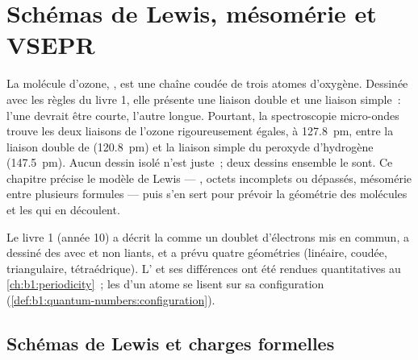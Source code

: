 \chapter{Schémas de Lewis, mésomérie et VSEPR}\label{ch:b1:lewis-resonance-vsepr}

La molécule d'ozone, , est une chaîne coudée de trois atomes
d'oxygène. Dessinée avec les règles du livre 1, elle présente une liaison
double et une liaison simple~: l'une devrait être courte, l'autre longue.
Pourtant, la spectroscopie micro-ondes trouve les deux liaisons 
de l'ozone rigoureusement égales, à \qty{127.8}{pm}, entre la liaison
double de  (\qty{120.8}{pm}) et la liaison simple du peroxyde
d'hydrogène (\qty{147.5}{pm}). Aucun dessin isolé n'est juste~; deux
dessins ensemble le sont. Ce chapitre précise le modèle de Lewis ---
, octets incomplets ou dépassés, mésomérie entre
plusieurs formules --- puis s'en sert pour prévoir la géométrie des
molécules et les  qui en découlent.

\begin{recall}
Le livre 1 (année 10) a décrit la  comme un doublet
d'électrons mis en commun, a dessiné des  avec  et non liants, et a prévu quatre géométries (linéaire, coudée,
triangulaire, tétraédrique). L' et ses différences ont
été rendues quantitatives au \cref{ch:b1:periodicity}~; les  d'un atome se lisent sur sa configuration
(\cref{def:b1:quantum-numbers:configuration}).
\end{recall}

\section{Schémas de Lewis et charges formelles}


